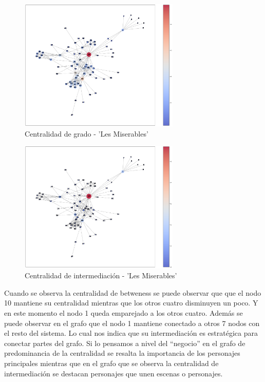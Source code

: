 \documentclass[conference]{IEEEtran}
\begin{document}
\begin{figure}[h]
    \centering
    \includegraphics[width=3in]{img/les_miserables_centralidad_degree.png}
    \caption{Centralidad de grado - 'Les Miserables'}
    \label{fig:les_miserables_centralidad_deg}
\end{figure}

\begin{figure}[h]
    \centering
    \includegraphics[width=3in]{img/les_miserables_centralidad_betweness.png}
    \caption{Centralidad de intermediación - 'Les Miserables'}
    \label{fig:les_miserables_centralidad_bet}
\end{figure}

Cuando se observa la centralidad de betweness se puede observar que que el nodo 10 mantiene su centralidad mientras que los otros cuatro disminuyen un poco. Y en este momento el nodo 1 queda emparejado a los otros cuatro. Además se puede observar en el grafo que el nodo 1 mantiene conectado a otros 7 nodos con el resto del sistema. Lo cual nos indica que su intermediación es estratégica para conectar partes del grafo.
Si lo pensamos a nivel del “negocio” en el grafo de predominancia de la centralidad se resalta la importancia de los personajes principales mientras que en el grafo que se observa la centralidad de intermediación se destacan personajes que unen escenas o personajes.
\end{document}
